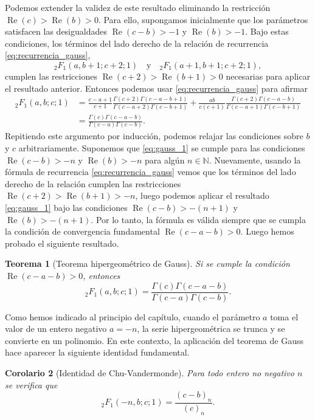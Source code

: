 \documentclass[12pt,a4paper]{book}
\renewcommand{\Re}{\operatorname{Re}}
\newtheorem{theorem}{Teorema}
\newtheorem{corollary}[theorem]{Corolario}
\begin{document}
Podemos extender la validez de este resultado eliminando la restricción $\Re(c) > \Re(b) > 0$. Para ello, supongamos inicialmente que los parámetros satisfacen las desigualdades $\Re(c - b) > -1$ y $\Re(b) > -1$.
Bajo estas condiciones, los términos del lado derecho de la relación de recurrencia \eqref{eq:recurrencia_gauss},
\[
    {}_{2}F_{1}(a, b + 1; c + 2; 1) \quad \text{y} \quad {}_{2}F_{1}(a + 1, b + 1; c + 2; 1),
\]
cumplen las restricciones $\Re(c+2) > \Re(b+1) > 0$ necesarias para aplicar el resultado anterior. Entonces podemos usar \eqref{eq:recurrencia_gauss} para afirmar
\begin{align*}
    {}_{2}F_{1}(a, b; c; 1) &= \frac{c - a + 1}{c + 1} \frac{\Gamma(c + 2)\Gamma(c - a - b + 1)}{\Gamma(c - a + 2)\Gamma(c - b + 1)} 
    + \frac{ab}{c(c + 1)} \frac{\Gamma(c + 2)\Gamma(c - a - b)}{\Gamma(c - a + 1)\Gamma(c - b + 1)}
    \\ &=\frac{\Gamma(c)\Gamma(c - a - b)}{\Gamma(c - a)\Gamma(c - b)}.
\end{align*}
Repitiendo este argumento por inducción, podemos relajar las condiciones sobre $b$ y $c$ arbitrariamente. Suponemos que \eqref{eq:gauss_1} se cumple para las condiciones $\Re(c - b) > -n$ y $\Re(b) > -n$ para algún $n \in \mathbb{N}$. Nuevamente, usando la fórmula de recurrencia \eqref{eq:recurrencia_gauss} vemos que los términos del lado derecho de la relación cumplen las restricciones $\Re(c+2) > \Re(b+1) > -n$, luego podemos aplicar el resultado \eqref{eq:gauss_1} bajo las condiciones $\Re(c - b) > -(n+1)$ y $\Re(b) > -(n+1)$. Por lo tanto, la fórmula es válida siempre que se cumpla la condición de convergencia fundamental $\Re(c - a - b) > 0$.
Luego hemos probado el siguiente resultado.
\begin{theorem}[Teorema hipergeométrico de Gauss]
\label{teo:gauss_z1}
Si se cumple la condición $\Re(c - a - b) > 0$, entonces
\[
{}_{2}F_{1}(a, b; c; 1) = \frac{\Gamma(c)\Gamma(c - a - b)}{\Gamma(c - a)\Gamma(c - b)}.
\]
\end{theorem}

Como hemos indicado al principio del capítulo, cuando el parámetro $a$ toma el valor de un entero negativo $a=-n$, la serie hipergeométrica se trunca y se convierte en un polinomio. En este contexto, la aplicación del teorema de Gauss hace aparecer la siguiente identidad fundamental.

\begin{corollary}[Identidad de Chu-Vandermonde]
\label{cor:chu_vandermonde}
Para todo entero no negativo $n$ se verifica que
\[
    {}_{2}F_{1}(-n, b; c; 1) = \frac{(c-b)_n}{(c)_n}.
\]
\end{corollary}
\end{document}
